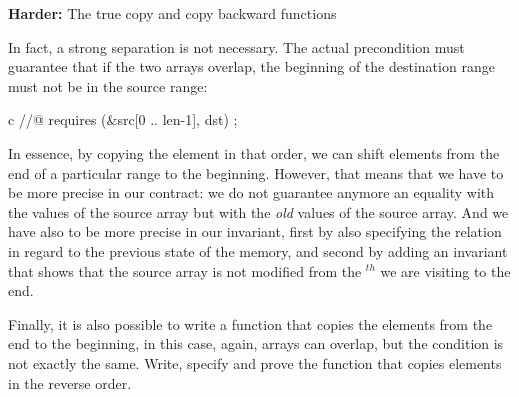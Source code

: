 

\textbf{Harder:} The true copy and copy backward functions


In fact, a strong separation is not necessary. The actual precondition must
guarantee that if the two arrays overlap, the beginning of the destination
range must not be in the source range:


\begin{CodeBlock}{c}
//@ requires \separated(&src[0 .. len-1], dst) ;
\end{CodeBlock}


In essence, by copying the element in that order, we can shift elements from
the end of a particular range to the beginning. However, that means that we
have to be more precise in our contract: we do not guarantee anymore an equality
with the values of the source array but with the \emph{old} values of the
source array. And we have also to be more precise in our invariant, first by
also specifying the relation in regard to the previous state of the memory, and
second by adding an invariant that shows that the source array is not modified
from the $^{th}$ we are visiting to the end.


Finally, it is also possible to write a function that copies the elements from
the end to the beginning, in this case, again, arrays can overlap, but the
condition is not exactly the same. Write, specify and prove the function
 that copies elements in the reverse order.
